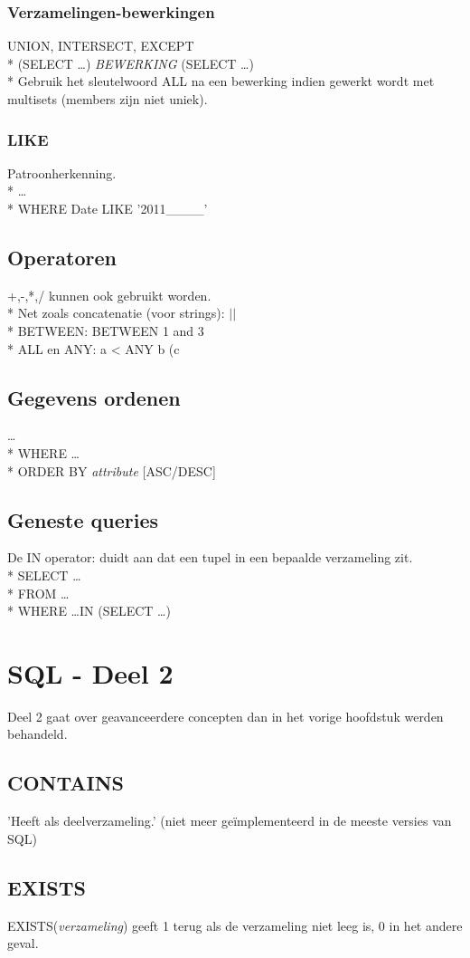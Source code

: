 \documentclass[10pt]{article}
\begin{document}
\subsubsection{Verzamelingen-bewerkingen}
UNION, INTERSECT, EXCEPT\\*
(SELECT \dots) \textit{BEWERKING} (SELECT \dots)\\*
Gebruik het sleutelwoord ALL na een bewerking indien gewerkt wordt met multisets (members zijn niet uniek).
\subsubsection{LIKE}
Patroonherkenning.\\*
\dots\\*
WHERE Date LIKE '2011\_\_\_\_'
\subsection{Operatoren}
+,-,*,/ kunnen ook gebruikt worden.\\*
Net zoals concatenatie (voor strings): $||$\\*
BETWEEN: BETWEEN 1 and 3\\*
ALL en ANY: a < ANY b (c 
\subsection{Gegevens ordenen}
\dots\\*
WHERE \dots\\*
ORDER BY \textit{attribute} [ASC/DESC]
\subsection{Geneste queries}
De IN operator: duidt aan dat een tupel in een bepaalde verzameling zit.\\*
SELECT \dots\\*
FROM \dots\\*
WHERE \dots IN (SELECT \dots)
\section{SQL - Deel 2}
Deel 2 gaat over geavanceerdere concepten dan in het vorige hoofdstuk werden behandeld.
\subsection{CONTAINS}
'Heeft als deelverzameling.' (niet meer ge\"implementeerd in de meeste versies van SQL)
\subsection{EXISTS}
EXISTS(\textit{verzameling}) geeft 1 terug als de verzameling niet leeg is, 0 in het andere geval.
\end{document}

